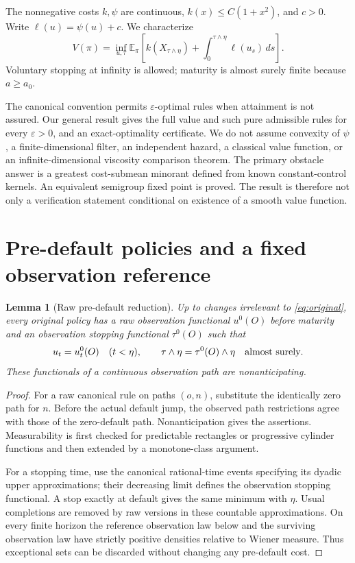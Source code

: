 \documentclass[11pt,a4paper]{article}
\newtheorem{lemma}[theorem]{Lemma}
\theoremstyle{definition}
\theoremstyle{remark}
\newcommand{\E}{\mathbb E}
\begin{document}
The nonnegative costs \(k,\psi\) are continuous, \(k(x)\leq C(1+x^2)\),
and \(c>0\). Write \(\ell(u)=\psi(u)+c\). We characterize
\begin{equation}\label{eq:original}
 V(\pi)=\inf_{u,\tau}\E_\pi\left[
 k(X_{\tau\wedge\eta})+\int_0^{\tau\wedge\eta}\ell(u_s)\,ds\right].
\end{equation}
Voluntary stopping at infinity is allowed; maturity is almost surely
finite because \(a\geq a_0\).

The canonical convention permits \(\varepsilon\)-optimal rules when
attainment is not assured. Our general result gives the full value and
such pure admissible rules for every \(\varepsilon>0\), and an
exact-optimality certificate. We do not assume convexity of \(\psi\),
a finite-dimensional filter, an independent hazard, a classical value
function, or an infinite-dimensional viscosity comparison theorem.
The primary obstacle answer is a greatest cost-submean minorant defined
from known constant-control kernels. An equivalent semigroup fixed
point is proved. The result is therefore not only a verification
statement conditional on existence of a smooth value function.

\section{Pre-default policies and a fixed observation reference}

\begin{lemma}[Raw pre-default reduction]\label{lem:raw}
Up to changes irrelevant to \eqref{eq:original}, every original policy
has a raw observation functional \(u^0(O)\) before maturity and an
observation stopping functional \(\tau^0(O)\) such that
\[
 u_t=u_t^0(O)\quad(t<\eta),\qquad
 \tau\wedge\eta=\tau^0(O)\wedge\eta
 \quad\hbox{almost surely}.
\]
These functionals of a continuous observation path are nonanticipating.
\end{lemma}
\begin{proof}
For a raw canonical rule on paths \((o,n)\), substitute the identically
zero path for \(n\). Before the actual default jump, the observed path
restrictions agree with those of the zero-default path. Nonanticipation
gives the assertions. Measurability is first checked for predictable
rectangles or progressive cylinder functions and then extended by a
monotone-class argument.

For a stopping time, use the canonical rational-time events specifying
its dyadic upper approximations; their decreasing limit defines the
observation stopping functional. A stop exactly at default gives the
same minimum with \(\eta\). Usual completions are removed by raw versions
in these countable approximations. On every finite horizon the reference
observation law below and the surviving observation law have strictly
positive densities relative to Wiener measure. Thus exceptional sets
can be discarded without changing any pre-default cost.
\end{proof}
\end{document}
